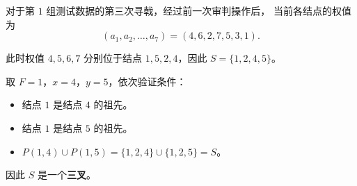 \begin{figure}[htbp]
\end{figure}

对于第 $1$ 组测试数据的第三次寻戟，经过前一次审判操作后，
当前各结点的权值为
\[
(a_1,a_2,\ldots,a_7)=(4,6,2,7,5,3,1).
\]

此时权值 $4,5,6,7$ 分别位于结点 $1,5,2,4$，因此 $S=\{1,2,4,5\}$。

取 $F=1$，$x=4$，$y=5$，依次验证条件：

\begin{itemize}
\item 结点 $1$ 是结点 $4$ 的祖先。
\item 结点 $1$ 是结点 $5$ 的祖先。
\item $ P(1,4)\cup P(1,5) =\{1,2,4\}\cup\{1,2,5\}=S$。
\end{itemize}

因此 $S$ 是一个\textbf{三叉}。


